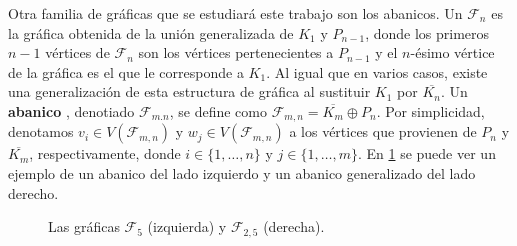 Otra  familia de gr\'aficas que se estudiar\'a este trabajo son los abanicos. Un
 $\mathcal{F}_n$ es la gr\'afica obtenida de la uni\'on
generalizada de $K_1$ y $P_{n-1}$, donde los primeros $n-1$ v\'ertices de
$\mathcal{F}_n$ son los v\'ertices pertenecientes a $P_{n-1}$ y el $n$-\'esimo
v\'ertice de la gr\'afica es el que le corresponde a $K_1$. Al igual que en
varios casos, existe una generalizaci\'on de esta estructura de gr\'afica al
sustituir $K_1$ por $\overline{K_n}$. Un \textbf{abanico}
, denotiado $\mathcal{F}_{m.n}$, se define como
$\mathcal{F}_{m,n}=\overline{K_m} \oplus P_n$. Por simplicidad, denotamos $v_i
\in V(\mathcal{F}_{m,n})$ y $w_j \in V(\mathcal{F}_{m,n})$ a los v\'ertices que
provienen de $P_n$ y $\overline{K_m}$, respectivamente, donde $i \in \{1, \dots,
n\}$ y $j \in \{1, \dots, m\}$. En \cref{fig:ex-abanico} se puede ver un ejemplo
de un abanico del lado izquierdo y un abanico generalizado del lado derecho.

\begin{figure}[ht!]
    \centering
\caption{Las gr\'aficas $\mathcal{F}_5$ (izquierda) y $\mathcal{F}_{2,5}$
(derecha).}
\label{fig:ex-abanico}
\end{figure}


